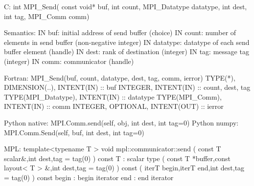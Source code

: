 C:
int MPI_Send(
  const void* buf, int count, MPI_Datatype datatype,
  int dest, int tag, MPI_Comm comm)

Semantics:
IN buf: initial address of send buffer (choice)
IN count: number of elements in send buffer (non-negative integer)
IN datatype: datatype of each send buffer element (handle)
IN dest: rank of destination (integer)
IN tag: message tag (integer)
IN comm: communicator (handle)

Fortran:
MPI_Send(buf, count, datatype, dest, tag, comm, ierror)
TYPE(*), DIMENSION(..), INTENT(IN) :: buf
INTEGER, INTENT(IN) :: count, dest, tag
TYPE(MPI_Datatype), INTENT(IN) :: datatype
TYPE(MPI_Comm), INTENT(IN) :: comm
INTEGER, OPTIONAL, INTENT(OUT) :: ierror 

Python native:
MPI.Comm.send(self, obj, int dest, int tag=0)
Python numpy:
MPI.Comm.Send(self, buf, int dest, int tag=0)

MPL:
template<typename T >
void mpl::communicator::send
   ( const T scalar&,int dest,tag = tag(0) ) const
T : scalar type
   ( const T *buffer,const layout< T > &,int dest,tag = tag(0) ) const
   ( iterT begin,iterT end,int dest,tag = tag(0) ) const
begin : begin iterator
end : end iterator
